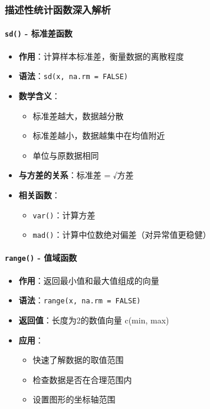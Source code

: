 \documentclass[
]{book}
\providecommand{\tightlist}{%
  \setlength{\itemsep}{0pt}\setlength{\parskip}{0pt}}
\begin{document}
\hypertarget{ux63cfux8ff0ux6027ux7edfux8ba1ux51fdux6570ux6df1ux5165ux89e3ux6790}{%
\subsubsection{描述性统计函数深入解析}\label{ux63cfux8ff0ux6027ux7edfux8ba1ux51fdux6570ux6df1ux5165ux89e3ux6790}}

\hypertarget{sd---ux6807ux51c6ux5deeux51fdux6570}{%
\paragraph{\texorpdfstring{\texttt{sd()} - 标准差函数}{sd() - 标准差函数}}\label{sd---ux6807ux51c6ux5deeux51fdux6570}}

\begin{itemize}
\tightlist
\item
  \textbf{作用}：计算样本标准差，衡量数据的离散程度
\item
  \textbf{语法}：\texttt{sd(x,\ na.rm\ =\ FALSE)}
\item
  \textbf{数学含义}：

  \begin{itemize}
  \tightlist
  \item
    标准差越大，数据越分散
  \item
    标准差越小，数据越集中在均值附近
  \item
    单位与原数据相同
  \end{itemize}
\item
  \textbf{与方差的关系}：标准差 = √方差
\item
  \textbf{相关函数}：

  \begin{itemize}
  \tightlist
  \item
    \texttt{var()}：计算方差
  \item
    \texttt{mad()}：计算中位数绝对偏差（对异常值更稳健）
  \end{itemize}
\end{itemize}

\hypertarget{range---ux503cux57dfux51fdux6570}{%
\paragraph{\texorpdfstring{\texttt{range()} - 值域函数}{range() - 值域函数}}\label{range---ux503cux57dfux51fdux6570}}

\begin{itemize}
\tightlist
\item
  \textbf{作用}：返回最小值和最大值组成的向量
\item
  \textbf{语法}：\texttt{range(x,\ na.rm\ =\ FALSE)}
\item
  \textbf{返回值}：长度为2的数值向量 c(min, max)
\item
  \textbf{应用}：

  \begin{itemize}
  \tightlist
  \item
    快速了解数据的取值范围
  \item
    检查数据是否在合理范围内
  \item
    设置图形的坐标轴范围
  \end{itemize}
\end{itemize}
\end{document}
